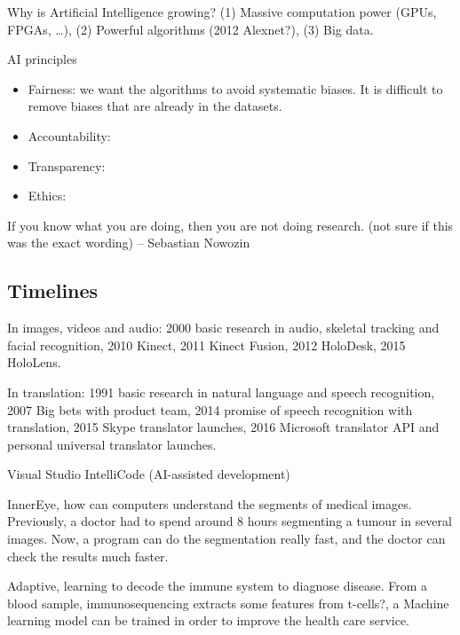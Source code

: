 Why is Artificial Intelligence growing? (1) Massive computation power (GPUs,
FPGAs, \dots), (2) Powerful algorithms (2012 Alexnet?), (3) Big data.

AI principles

\begin{itemize}
  \item Fairness: we want the algorithms to avoid systematic biases. It is
    difficult to remove biases that are already in the datasets.
  \item Accountability:
  \item Transparency:
  \item Ethics:
\end{itemize}

\begin{mybox}
  If you know what you are doing, then you are not doing research. (not sure if
  this was the exact wording) -- Sebastian Nowozin
\end{mybox}

\subsection{Timelines}

In images, videos and audio: 2000 basic research in audio, skeletal tracking
and facial recognition, 2010 Kinect, 2011 Kinect Fusion, 2012 HoloDesk, 2015
HoloLens.

In translation: 1991 basic research in natural language and speech recognition,
2007 Big bets with product team, 2014 promise of speech recognition with
translation, 2015 Skype translator launches, 2016 Microsoft translator API and
personal universal translator launches.

Visual Studio IntelliCode (AI-assisted development)

InnerEye, how can computers understand the segments of medical images.
Previously, a doctor had to spend around 8 hours segmenting a tumour in several
images. Now, a program can do the segmentation really fast, and the doctor can
check the results much faster.

Adaptive, learning to decode the immune system to diagnose disease. From a
blood sample, immunosequencing extracts some features from t-cells?, a Machine
learning model can be trained in order to improve the health care service.
